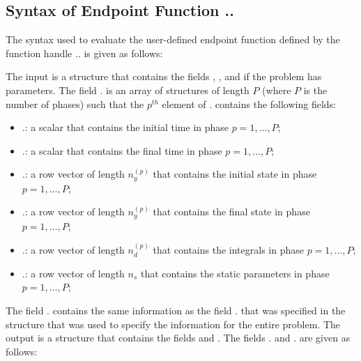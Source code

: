\documentclass[10pt]{article}
\newcommand{\bfblue}[1]{\textrm{{\color{blue}{\bf #1}}}}
\newcommand{\slred}[1]{\textrm{\color{red}{\sl #1}}}
\begin{document}
\subsection{Syntax of Endpoint Function \slred{setup}.\bfblue{functions}.\bfblue{endpoint}}\label{sect:endpointSyntax}

The syntax used to evaluate the user-defined endpoint function defined
by the function handle \slred{setup}.\bfblue{functions}.\bfblue{endpoint} is given as follows:
\begin{center}
\end{center}
The input \slred{input} is a structure that contains the fields
\bfblue{phase}, \bfblue{auxdata}, and \bfblue{parameter} if the problem has parameters.  The field
\slred{input}.\bfblue{phase} is an array of structures of length $P$
(where $P$ is the number of phases) such that the $p^{th}$ element of 
\slred{input}.\bfblue{phase} contains the following fields:
\begin{itemize}
  \item \slred{input}.\bfblue{phase($p$).initialtime}:  a scalar that contains the initial time in phase $p=1,\ldots,P$;
 \item \slred{input}.\bfblue{phase($p$).finaltime}:  a scalar that contains the final time in phase $p=1,\ldots,P$;
 \item \slred{input}.\bfblue{phase($p$).initialstate}:  a row vector of length $n_y^{(p)}$ that contains the initial state in phase $p=1,\ldots,P$;
 \item \slred{input}.\bfblue{phase($p$).finalstate}:  a row vector of length $n_y^{(p)}$ that contains the final state in phase $p=1,\ldots,P$;
 \item \slred{input}.\bfblue{phase($p$).integral}:  a row vector of length $n_d^{(p)}$ that contains the integrals in phase $p=1,\ldots,P$;
 \item \slred{input}.\bfblue{parameter}:  a row vector of length $n_s$ that contains the static parameters in phase $p=1,\ldots,P$;
\end{itemize}
The field \slred{input}.\bfblue{auxdata} contains the same
information as the field \slred{input}.\bfblue{auxdata} that was
specified in the structure \slred{input} that was used to specify the
information for the entire problem.   The output \slred{output} is a
structure that contains the fields \bfblue{objective} and
\bfblue{eventgroup}.  The fields \slred{output}.\bfblue{objective} and
\slred{output}.\bfblue{eventgroup} are given as follows:
\end{document}
